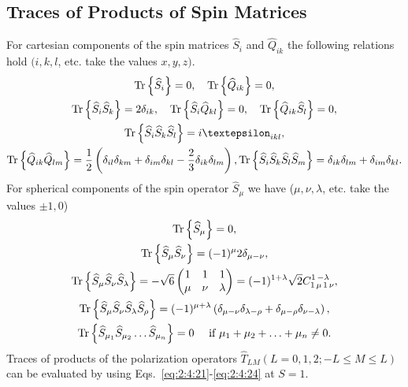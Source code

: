 \subsection{Traces of Products of Spin Matrices}
For cartesian components of the spin matrices $\widehat{S}_{i}$ and $\widehat{Q}_{i k}$ the following relations hold $(i, k, l$, etc. take the values $x, y, z)$.
\begin{gather}
\Tr \left\{\widehat{S}_{i}\right\}=0, \quad \Tr \left\{\widehat{Q}_{i k}\right\}=0,  \notag\\
\Tr \left\{\widehat{S}_{i} \widehat{S}_{k}\right\}=2 \delta_{i k}, \quad \Tr \left\{\widehat{S}_{i} \widehat{Q}_{k l}\right\}=0, \quad \Tr \left\{\widehat{Q}_{i k} \widehat{S}_{l}\right\}=0,  \notag\\
\Tr \left\{\widehat{S}_{i} \widehat{S}_{k} \widehat{S}_{l}\right\}=i \varepsilon_{i k l},  \label{eq:2:6:89}\\
\Tr \left\{\widehat{Q}_{i k} \widehat{Q}_{l m}\right\}=\frac{1}{2}\left(\delta_{i l} \delta_{k m}+\delta_{i m} \delta_{k l}-\frac{2}{3} \delta_{i k} \delta_{l m}\right), \Tr \left\{\widehat{S}_{i} \widehat{S}_{k} \widehat{S}_{l} \widehat{S}_{m}\right\}=\delta_{i k} \delta_{l m}+\delta_{i m} \delta_{k l}. \notag
\end{gather}
For spherical components of the spin operator $\widehat{S}_{\mu}$ we have ($\mu, \nu, \lambda$, etc. take the values $\pm 1,0$)
\begin{gather}
\operatorname{Tr} \left\{\widehat{S}_{\mu}\right\}=0 , \notag\\
\operatorname{Tr} \left\{\widehat{S}_{\mu} \widehat{S}_{\nu}\right\}=(-1)^{\mu} 2 \delta_{\mu-\nu} , \notag\\
\operatorname{Tr} \left\{\widehat{S}_{\mu} \widehat{S}_{\nu} \widehat{S}_{\lambda}\right\}=-\sqrt{6}\begin{pmatrix}
1 & 1 & 1 \\
\mu & \nu & \lambda
\end{pmatrix}=(-1)^{1+\lambda} \sqrt{2} C_{1\,\mu\,1\,\nu}^{1\,-\lambda},  \label{eq:2:6:90}\\
\operatorname{Tr} \left\{\widehat{S}_{\mu} \widehat{S}_{\nu} \widehat{S}_{\lambda} \widehat{S}_{\rho}\right\}=(-1)^{\mu+\lambda}\left(\delta_{\mu-\nu} \delta_{\lambda-\rho}+\delta_{\mu-\rho} \delta_{\nu-\lambda}\right),  \notag\\
\operatorname{Tr} \left\{\widehat{S}_{\mu_{1}} \widehat{S}_{\mu_{2}} \ldots \widehat{S}_{\mu_{n}}\right\}=0 \quad \text { if } \mu_{1}+\mu_{2}+\ldots+\mu_{n} \neq 0. \label{eq:2:6:91}
\end{gather}
Traces of products of the polarization operators $\widehat{T}_{L M}(L=0,1,2 ;-L \leq M \leq L)$ can be evaluated by using Eqs.~\eqref{eq:2:4:21}-\eqref{eq:2:4:24} at $S=1$.
